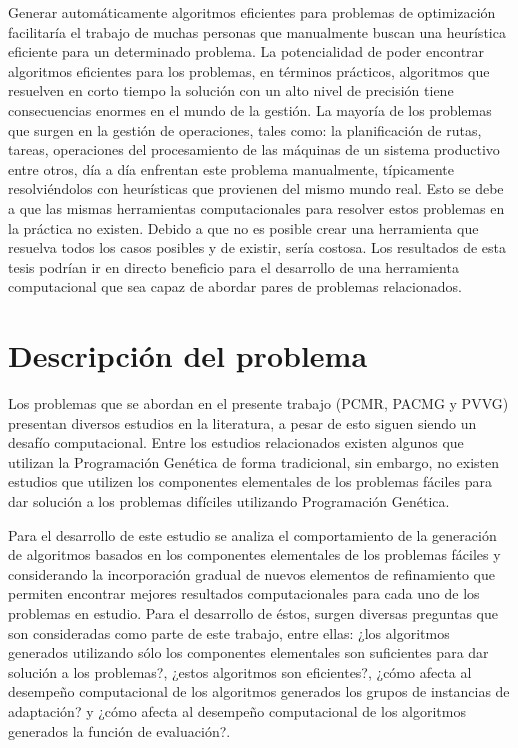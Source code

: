 Generar automáticamente algoritmos eficientes para problemas de optimización facilitaría el trabajo de muchas personas que manualmente buscan una heurística eficiente para un determinado problema. La potencialidad de poder encontrar algoritmos eficientes para los problemas, en términos prácticos, algoritmos que resuelven en corto tiempo la solución con un alto nivel de precisión tiene consecuencias enormes en el mundo de la gestión. La mayoría de los problemas que surgen en la gestión de operaciones, tales como: la planificación de rutas, tareas, operaciones del procesamiento de las máquinas de un sistema productivo entre otros, día a día enfrentan este problema manualmente, típicamente resolviéndolos con heurísticas que provienen del mismo mundo real. Esto se debe a que las mismas herramientas computacionales para resolver estos problemas en la práctica no existen. Debido a que no es posible crear una herramienta que resuelva todos los casos posibles y de existir, sería costosa. Los resultados de esta tesis podrían ir en directo beneficio para el desarrollo de una herramienta computacional que sea capaz de abordar pares de problemas relacionados.


\section{Descripción del problema}
\label{intro:problema}

Los problemas que se abordan en el presente trabajo (PCMR, PACMG y PVVG) presentan diversos estudios en la literatura, a pesar de esto siguen siendo un desafío computacional. Entre los estudios relacionados existen algunos que utilizan la Programación Genética de forma tradicional, sin embargo, no existen estudios que utilizen los componentes elementales de los problemas fáciles para dar solución a los problemas difíciles utilizando Programación Genética.

Para el desarrollo de este estudio se analiza el comportamiento de la generación de algoritmos basados en los componentes elementales de los problemas fáciles y considerando la incorporación gradual de nuevos elementos de refinamiento que permiten encontrar mejores resultados computacionales para cada uno de los problemas en estudio. Para el desarrollo de éstos, surgen diversas preguntas que son consideradas como parte de este trabajo, entre ellas: ¿los algoritmos generados utilizando sólo los componentes elementales son suficientes para dar solución a los problemas?, ¿estos algoritmos son eficientes?, ¿cómo afecta al desempeño computacional de los algoritmos generados los grupos de instancias de adaptación? y ¿cómo afecta al desempeño computacional de los algoritmos generados la función de evaluación?.

